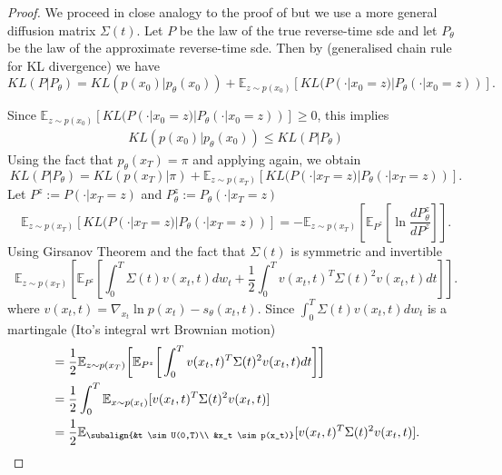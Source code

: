     
\begin{proof}   
    We proceed in close analogy to the proof of \cite[Theorem 1]{song2021maximum} but we use a more general diffusion matrix $\Sigma(t)$. 
    Let $P$ be the law of the true reverse-time sde and let $P_\theta$ be the law of the approximate reverse-time sde. 
    Then by  \cite[Theorem 2.4]{leonard2013properties} (generalised chain rule for KL divergence) we have
    \begin{equation}
        KL(P | P_\theta) = KL(p(x_0) | p_\theta(x_0)) + \mathbb{E}_{z \sim p(x_0)}[KL(P(\cdot | x_0=z) |P_\theta(\cdot | x_0=z))].
    \end{equation}
    
    Since $\mathbb{E}_{z \sim p(x_0)}[KL(P(\cdot | x_0=z) |P_\theta(\cdot | x_0=z))] \geq 0$, this implies 
    \begin{align*}
       KL(p(x_0) | p_\theta(x_0)) \leq KL(P | P_\theta) 
    \end{align*}
    Using the fact that $p_\theta(x_T) = \pi$ and applying \cite[Theorem 2.4]{leonard2013properties} again, we obtain
    \begin{equation}
        KL(P | P_\theta) = KL(p(x_T) |\pi) + \mathbb{E}_{z \sim p(x_T)}[KL(P(\cdot | x_T=z) |P_\theta(\cdot | x_T=z))].
    \end{equation}    
    Let $P^z := P(\cdot | x_T=z)$ and $P_\theta^z := P_\theta(\cdot | x_T=z)$
    \begin{equation}
        \mathbb{E}_{z \sim p(x_T)}[KL(P(\cdot | x_T=z) |P_\theta(\cdot | x_T=z))] = - \mathbb{E}_{z \sim p(x_T)} \left[ \mathbb{E}_{P^z} \left[ \ln \frac{d P^z_\theta}{d P^z} \right] \right].
    \end{equation}    
    Using Girsanov Theorem \cite[Theorem 8.6.5]{oksendal2003sde} and the fact that $\Sigma(t)$ is symmetric and invertible 
    \begin{equation}
        \mathbb{E}_{z \sim p(x_T)} \left[ \mathbb{E}_{P^z} \left[ \int_0^T \Sigma(t) v(x_t,t) dw_t + \frac{1}{2} \int_0^T v(x_t,t)^T \Sigma(t)^2 v(x_t,t) dt \right] \right].
    \end{equation}    
    where $v(x_t,t)=\nabla_{x_t} \ln{p(x_t)} - s_\theta(x_t,t)$. Since $\int_0^T  \Sigma(t) v(x_t,t) dw_t $ is a martingale (Ito's integral wrt Brownian motion) 
    \begin{align*}
        &=  \frac{1}{2} \mathbb{E}_{z \sim p(x_T)}  \bigg[ 
            \mathbb{E}_{P^z} \bigg[
                     \int_0^T v(x_t,t)^T \Sigma(t)^2 v(x_t,t) dt 
            \bigg]
        \bigg] \\
        &= \frac{1}{2} \int_0^T \mathbb{E}_{x \sim p(x_t)}[ v(x_t,t)^T \Sigma(t)^2 v(x_t,t)] \\
        &= \frac{1}{2} \mathbb{E}_{\subalign{&t \sim U(0,T)\\ &x_t \sim p(x_t)}} 
        [
            v(x_t,t)^T \Sigma(t)^2 v(x_t,t)
        ].
    \end{align*}
\end{proof}

